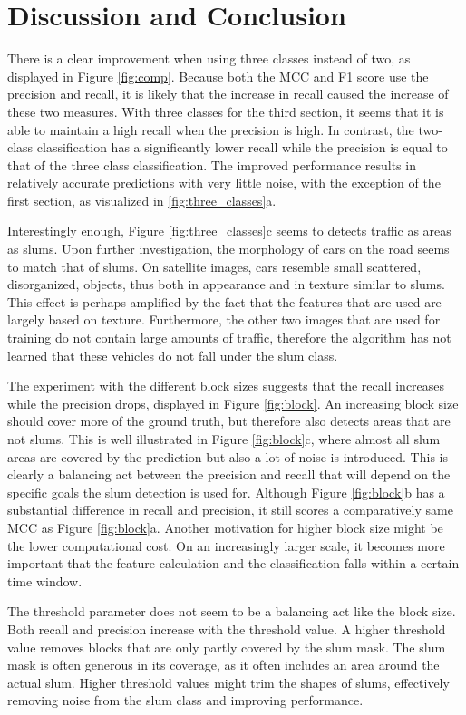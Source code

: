 \section{Discussion and Conclusion}
There is a clear improvement when using three classes instead of two, as displayed in Figure \ref{fig:comp}. Because both the MCC and F1 score use the precision and recall, it is likely that the increase in recall caused the increase of these two measures. With three classes for the third section, it seems that it is able to maintain a high recall when the precision is high. In contrast, the two-class classification has a significantly lower recall while the precision is equal to that of the three class classification. The improved performance results in relatively accurate predictions with very little noise, with the exception of the first section, as visualized in \ref{fig:three_classes}a.

Interestingly enough, Figure \ref{fig:three_classes}c seems to detects traffic as areas as slums. Upon further investigation, the morphology of cars on the road seems to match that of slums. On satellite images, cars resemble small scattered, disorganized, objects, thus both in appearance and in texture similar to slums. This effect is perhaps amplified by the fact that the features that are used are largely based on texture. Furthermore, the other two images that are used for training do not contain large amounts of traffic, therefore the algorithm has not learned that these vehicles do not fall under the slum class.

The experiment with the different block sizes suggests that the recall increases while the precision drops, displayed in Figure \ref{fig:block}. An increasing block size should cover more of the ground truth, but therefore also detects areas that are not slums. This is well illustrated in Figure \ref{fig:block}c, where almost all slum areas are covered by the prediction but also a lot of noise is introduced. This is clearly a balancing act between the precision and recall that will depend on the specific goals the slum detection is used for. Although Figure \ref{fig:block}b has a substantial difference in recall and precision, it still scores a comparatively same MCC as Figure \ref{fig:block}a. Another motivation for higher block size might be the lower computational cost. On an increasingly larger scale, it becomes more important that the feature calculation and the classification falls within a certain time window.

The threshold parameter does not seem to be a balancing act like the block size. Both recall and precision increase with the threshold value. A higher threshold value removes blocks that are only partly covered by the slum mask. The slum mask is often generous in its coverage, as it often includes an area around the actual slum. Higher threshold values might trim the shapes of slums, effectively removing noise from the slum class and improving performance.

